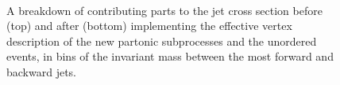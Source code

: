 \begin{figure}[t] 
\centering
{} \\
\caption{A breakdown of contributing parts to the jet cross section before (top) and after (bottom) implementing the effective vertex description of the new partonic subprocesses and the unordered events, in bins of the invariant mass between the most forward and backward jets.}
\label{fig:fklmigration}
\end{figure}

